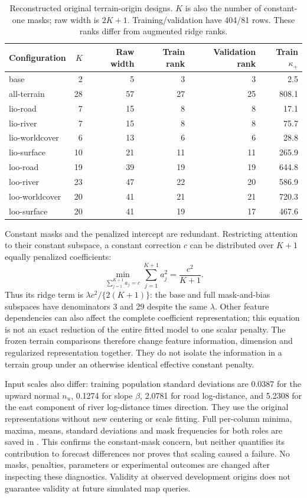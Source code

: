 \documentclass[11pt]{article}
\begin{document}
\begin{table}[htbp]
\centering\small
\caption{Reconstructed original terrain-origin designs. \(K\) is also the
number of constant-one masks; raw width is \(2K+1\). Training/validation
have 404/81 rows. These ranks differ from augmented ridge ranks.}
\label{tab:raw-terrain-design}
\begin{tabular}{lrrrrr}
\toprule
Configuration & \(K\) & Raw width & Train rank & Validation rank & Train \(\kappa_{+}\)\\
\midrule
base & 2 & 5 & 3 & 3 & 2.5\\
all-terrain & 28 & 57 & 27 & 25 & 808.1\\
lio-road & 7 & 15 & 8 & 8 & 17.1\\
lio-river & 7 & 15 & 8 & 8 & 75.7\\
lio-worldcover & 6 & 13 & 6 & 6 & 28.8\\
lio-surface & 10 & 21 & 11 & 11 & 265.9\\
loo-road & 19 & 39 & 19 & 19 & 644.8\\
loo-river & 23 & 47 & 22 & 20 & 586.9\\
loo-worldcover & 20 & 41 & 21 & 21 & 720.3\\
loo-surface & 20 & 41 & 19 & 17 & 467.6\\
\bottomrule
\end{tabular}
\end{table}

Constant masks and the penalized intercept are redundant. Restricting
attention to their constant subspace, a constant correction \(c\) can be
distributed over \(K+1\) equally penalized coefficients:
\begin{equation}
 \min_{\sum_{j=1}^{K+1}a_j=c}\sum_{j=1}^{K+1}a_j^2
      =\frac{c^2}{K+1}.
 \label{eq:constant-mask-penalty}
\end{equation}
Thus its ridge term is \(\lambda c^2/\{2(K+1)\}\): the base and full
mask-and-bias subspaces have denominators 3 and 29 despite the same
\(\lambda\). Other feature dependencies can also affect the complete
coefficient representation; this equation is not an exact reduction of the
entire fitted model to one scalar penalty. The frozen terrain comparisons
therefore change feature information, dimension and regularized
representation together. They do not isolate the information in a terrain
group under an otherwise identical effective constant penalty.

Input scales also differ: training population standard deviations are
0.0387 for the upward normal \(n_u\), 0.1274 for slope \(\beta\), 2.0781
for road log-distance, and 5.2308 for the east component of river
log-distance times direction. They use the original representations without
new centering or scale fitting. Full per-column minima, maxima, means,
standard deviations and mask frequencies for both roles are saved in
. This confirms the
constant-mask concern, but neither quantifies its contribution to forecast
differences nor proves that scaling caused a failure. No masks, penalties,
parameters or experimental outcomes are changed after inspecting these
diagnostics. Validity at observed development origins does not guarantee
validity at future simulated map queries.
\end{document}
